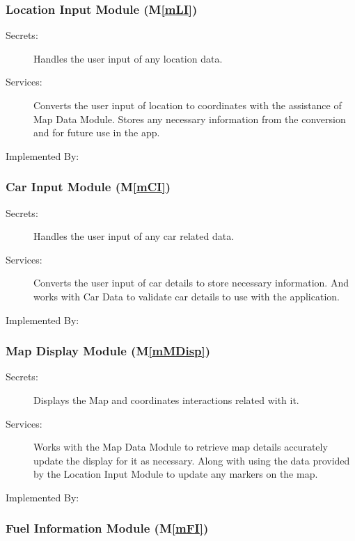 \documentclass[12pt, titlepage]{article}
\newcommand{\mref}[1]{M\ref{#1}}
\begin{document}
\subsubsection{Location Input Module (\mref{mLI})}

\begin{description}
\item[Secrets:] Handles the user input of any location data.
\item[Services:] Converts the user input of location to coordinates with the assistance 
of Map Data Module. Stores any necessary information from the conversion and for future 
use in the app.
\item[Implemented By:] \progname{}
\end{description}

\subsubsection{Car Input Module (\mref{mCI})}

\begin{description}
\item[Secrets:] Handles the user input of any car related data.
\item[Services:] Converts the user input of car details to store necessary information. 
And works with Car Data to validate car details to use with the application.
\item[Implemented By:] \progname{}
\end{description}

\subsubsection{Map Display Module (\mref{mMDisp})}

\begin{description}
\item[Secrets:] Displays the Map and coordinates interactions related with it.
\item[Services:] Works with the Map Data Module to retrieve map details accurately 
update the display for it as necessary. Along with using the data provided by the 
Location Input Module to update any markers on the map.
\item[Implemented By:] \progname{}
\end{description}

\subsubsection{Fuel Information Module (\mref{mFI})}
\end{document}
